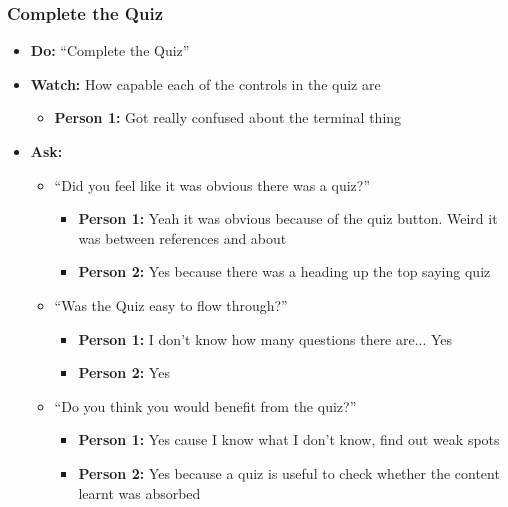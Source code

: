 \subsubsection{Complete the Quiz}
\begin{itemize}
	\item\textbf{Do:} ``Complete the Quiz''
	\item\textbf{Watch:} How capable each of the controls in the quiz are
	\begin{itemize}
		\item\textbf{Person 1:} Got really confused about the terminal thing
	\end{itemize}
	\item\textbf{Ask:}
	\begin{itemize}
		\item ``Did you feel like it was obvious there was a quiz?''
		\begin{itemize}
			\item\textbf{Person 1:} Yeah it was obvious because of the quiz button. Weird it was between references and about
			\item\textbf{Person 2:} Yes because there was a heading up the top saying quiz
		\end{itemize}
		\item ``Was the Quiz easy to flow through?''
		\begin{itemize}
			\item\textbf{Person 1:} I don't know how many questions there are... Yes
			\item\textbf{Person 2:} Yes
		\end{itemize}
		\item ``Do you think you would benefit from the quiz?''
		\begin{itemize}
			\item\textbf{Person 1:} Yes cause I know what I don't know, find out weak spots
			\item\textbf{Person 2:} Yes because a quiz is useful to check whether the content learnt was absorbed
		\end{itemize}
	\end{itemize}	
\end{itemize}


